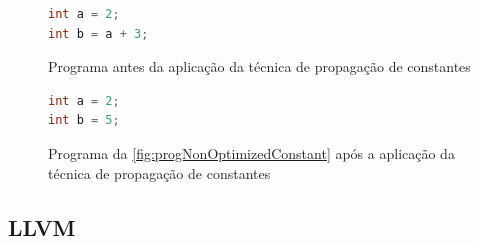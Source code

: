 \begin{figure}[H]
	\caption{\label{fig:progNonOptimizedConstant} Programa antes da aplicação da técnica de propagação de constantes }
	\begin{center}
    \begin{minipage}{0.5\textwidth}
    \begin{lstlisting}[language=C]       
int a = 2;
int b = a + 3;
	\end{lstlisting}
    \end{minipage}
	\end{center}
  \end{figure}

  \begin{figure}[H]
	\caption{\label{fig:progOptimizedConstant} Programa da \autoref{fig:progNonOptimizedConstant} após a aplicação da técnica de propagação de constantes }
	\begin{center}
    \begin{minipage}{0.5\textwidth}
    \begin{lstlisting}[language=C]       
int a = 2;
int b = 5;
	\end{lstlisting}
    \end{minipage}
	\end{center}
\end{figure}


\subsection{LLVM}

